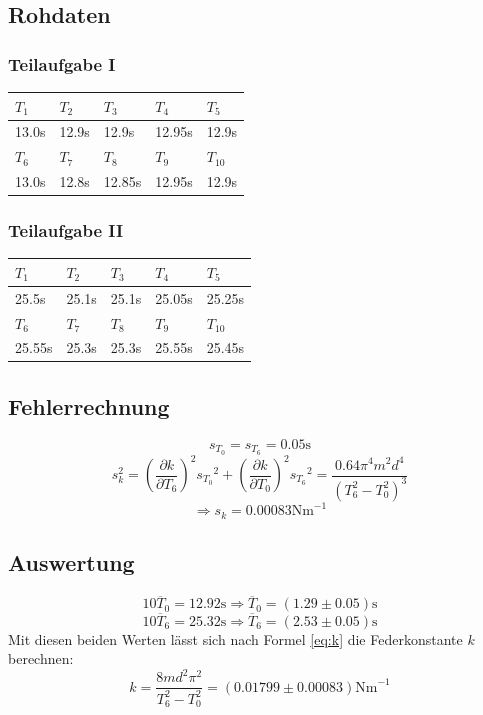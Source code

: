 \documentclass[12pt,a4paper]{article}
\begin{document}
\subsection*{Rohdaten}
\subsubsection*{Teilaufgabe I}
\begin{tabular}{|l|l|l|l|l|}
\hline
$T_{1}$&$T_{2}$&$T_{3}$&$T_{4}$&$T_{5}$\\
\hline
13.0s&12.9s&12.9s&12.95s&12.9s\\
\hline
\hline
$T_{6}$&$T_{7}$&$T_{8}$&$T_{9}$&$T_{10}$\\
\hline
13.0s&12.8s&12.85s&12.95s&12.9s\\
\hline
\end{tabular}

\subsubsection*{Teilaufgabe II}
\begin{tabular}{|l|l|l|l|l|}
\hline
$T_{1}$&$T_{2}$&$T_{3}$&$T_{4}$&$T_{5}$\\
\hline
25.5s&25.1s&25.1s&25.05s&25.25s\\
\hline
\hline
$T_{6}$&$T_{7}$&$T_{8}$&$T_{9}$&$T_{10}$\\
\hline
25.55s&25.3s&25.3s&25.55s&25.45s\\
\hline
\end{tabular}

\subsection*{Fehlerrechnung}
\[ s_{T_0} = s_{T_6} = 0.05\mbox{s} \]
\[ s_k^2 = \left( \frac{\partial k}{\partial T_6} \right)^2 {s_{T_0}}^2 + \left( \frac{\partial k}{\partial T_0} \right)^2 {s_{T_6}}^2 = \frac{0.64\pi^4m^2d^4}{(T_6^2-T_0^2)^3} \]
\[ \Rightarrow s_k = 0.00083\mbox{Nm}^{-1} \]

\subsection*{Auswertung}
\[ 10\overline{T}_0 = 12.92\mbox{s} \Rightarrow \overline{T}_0 = (1.29 \pm 0.05) \mbox{s} \]
\[ 10\overline{T}_6 = 25.32\mbox{s} \Rightarrow \overline{T}_6 = (2.53 \pm 0.05) \mbox{s} \]
Mit diesen beiden Werten l\"asst sich nach Formel \ref{eq:k} die Federkonstante $k$ berechnen:
\[ k = \frac{8md^2\pi^2}{T_6^2 - T_0^2} = (0.01799 \pm 0.00083) \mbox{Nm}^{-1} \]
\end{document}
